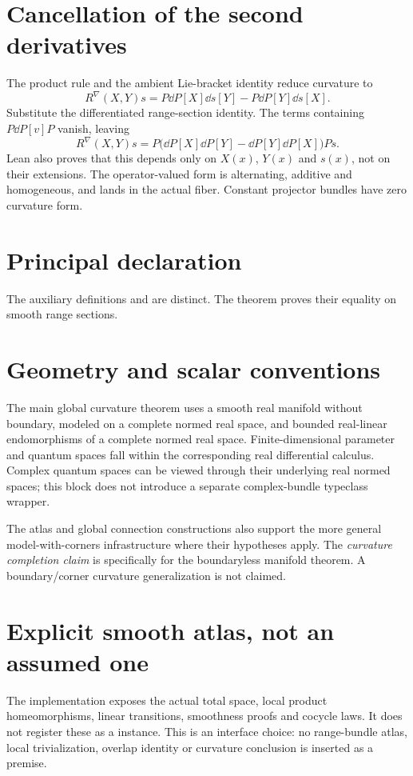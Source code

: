 \documentclass[10pt,letterpaper]{article}
\newcommand{\pageheading}[2]{\vspace*{2pt}{\small\color{ink}\textsc{#1}}\par\vspace{2pt}{\Large\bfseries #2}\par\vspace{4pt}}
\begin{document}
\section*{Cancellation of the second derivatives}
The product rule and the ambient Lie-bracket identity reduce curvature to
\[
R^\nabla(X,Y)s=P\dd P[X]\dd s[Y]-P\dd P[Y]\dd s[X].
\]
Substitute the differentiated range-section identity. The terms containing $P\dd P[v]P$ vanish, leaving
\[
R^\nabla(X,Y)s=
P\bigl(\dd P[X]\dd P[Y]-\dd P[Y]\dd P[X]\bigr)P s.
\]
Lean also proves that this depends only on $X(x)$, $Y(x)$ and $s(x)$, not on their extensions. The operator-valued form is alternating, additive and homogeneous, and lands in the actual fiber. Constant projector bundles have zero curvature form.

\section*{Principal declaration}

The auxiliary definitions  and
 are distinct. The theorem proves their equality on smooth range sections.

\newpage
\pageheading{Exact formal scope}{What the completion does and does not assert}
\section*{Geometry and scalar conventions}
The main global curvature theorem uses a smooth real manifold without boundary, modeled on a complete normed real space, and bounded real-linear endomorphisms of a complete normed real space. Finite-dimensional parameter and quantum spaces fall within the corresponding real differential calculus. Complex quantum spaces can be viewed through their underlying real normed spaces; this block does not introduce a separate complex-bundle typeclass wrapper.

The atlas and global connection constructions also support the more general model-with-corners infrastructure where their hypotheses apply. The \emph{curvature completion claim} is specifically for the boundaryless manifold theorem. A boundary/corner curvature generalization is not claimed.

\section*{Explicit smooth atlas, not an assumed one}
The implementation exposes the actual total space, local product homeomorphisms, linear transitions, smoothness proofs and cocycle laws. It does not register these as a  instance. This is an interface choice: no range-bundle atlas, local trivialization, overlap identity or curvature conclusion is inserted as a premise.
\end{document}
